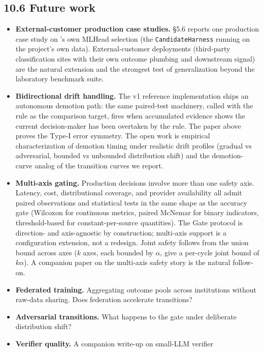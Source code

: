 \subsection{10.6 Future work}\label{future-work}

\begin{itemize}
\tightlist
\item
  \textbf{External-customer production case studies.} §5.6 reports one
  production case study on \sysname{}'s own MLHead selection (the
  \texttt{CandidateHarness} running on the project's own data).
  External-customer deployments (third-party classification sites with
  their own outcome plumbing and downstream signal) are the natural
  extension and the strongest test of generalization beyond the
  laboratory benchmark suite.
\item
  \textbf{Bidirectional drift handling.} The v1 reference implementation
  ships an autonomous demotion path: the same paired-test machinery,
  called with the rule as the comparison target, fires when accumulated
  evidence shows the current decision-maker has been overtaken by the
  rule. The paper above proves the Type-I error symmetry. The open work
  is empirical characterization of demotion timing under realistic drift
  profiles (gradual vs adversarial, bounded vs unbounded distribution
  shift) and the demotion-curve analog of the transition curves we
  report.
\item
  \textbf{Multi-axis gating.} Production decisions involve more than one
  safety axis. Latency, cost, distributional coverage, and provider
  availability all admit paired observations and statistical tests in
  the same shape as the accuracy gate (Wilcoxon for continuous metrics,
  paired McNemar for binary indicators, threshold-based for
  constant-per-source quantities). The Gate protocol is direction- and
  axis-agnostic by construction; multi-axis support is a configuration
  extension, not a redesign. Joint safety follows from the union bound
  across axes (\(k\) axes, each bounded by \(\alpha\), give a per-cycle
  joint bound of \(k\alpha\)). A companion paper on the multi-axis
  safety story is the natural follow-on.
\item
  \textbf{Federated training.} Aggregating outcome pools across
  institutions without raw-data sharing. Does federation accelerate
  transitions?
\item
  \textbf{Adversarial transitions.} What happens to the gate under
  deliberate distribution shift?
\item
  \textbf{Verifier quality.} A companion write-up on small-LLM verifier

\end{itemize}
